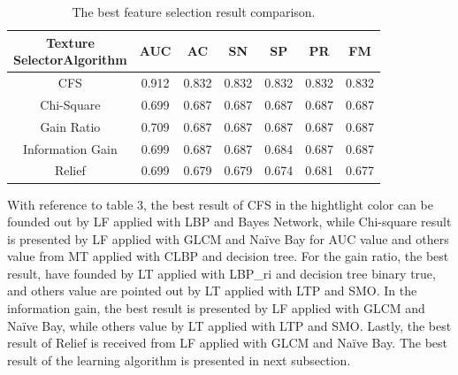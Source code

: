 \documentclass[review]{elsarticle}
\begin{document}
\begin{table}[h!]
	\centering
	\begin{tabular}{|c|c|c|c|c|c|c|}
		\hline 
		\backslashbox{Texture \\ Selector}{Algorithm} &AUC&AC&SN&SP&PR&FM\\
		\hline 
	\cellcolor{blue!25}CFS			& \cellcolor{blue!25} 0.912 & \cellcolor{blue!25}0.832  & \cellcolor{blue!25}0.832 & \cellcolor{blue!25}0.832  & \cellcolor{blue!25}0.832  & \cellcolor{blue!25}0.832 \\ 
		\hline 
		Chi-Square	& 0.699 & 0.687 & 0.687 &0.687  &0.687  &0.687  \\ 
		\hline 
		Gain Ratio		&0.709  &0.687  &0.687  &0.687  &0.687  &0.687  \\ 
		\hline 
		Information Gain 	&0.699  &0.687  &0.687  &0.684  &0.687  &0.687 \\ 
		\hline 
		Relief 		&0.699  &0.679  &0.679  &0.674 &0.681  &0.677  \\ 
		\hline
	\end{tabular} 
	\caption{The best feature selection result comparison. }
\end{table}
With reference to table 3, the best result of CFS in the hightlight color can be founded out by LF applied with LBP and Bayes Network, while Chi-square result is presented by LF applied with GLCM and Naïve Bay for AUC value and others value from MT applied with CLBP and decision tree. For the gain ratio, the best result, have founded by LT applied with LBP\_ri and decision tree binary true, and others value are pointed out by LT applied with LTP and SMO. In the information gain, the best result is presented by LF applied with GLCM and Naïve Bay, while others value by LT applied with LTP and SMO. Lastly, the best result of Relief is received from LF applied with GLCM and Naïve Bay. The best result of the learning algorithm is presented in next subsection.
\end{document}
